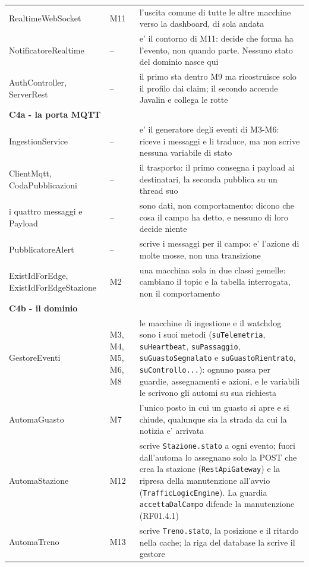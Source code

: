 \documentclass[11pt]{article}
\begin{document}
{\begin{longtable}{L{0.30\textwidth}L{0.13\textwidth}L{0.44\textwidth}}
RealtimeWebSocket & M11 & l'uscita comune di tutte le altre macchine verso la dashboard, di sola andata\\
NotificatoreRealtime & -- & e' il contorno di M11: decide che forma ha l'evento, non quando parte. Nessuno stato del dominio nasce qui\\
AuthController, ServerRest & -- & il primo sta dentro M9 ma ricostruisce solo il profilo dai claim; il secondo accende Javalin e collega le rotte\\
\hline
\textbf{C4a - la porta MQTT} &  & \\
IngestionService & -- & e' il generatore degli eventi di M3-M6: riceve i messaggi e li traduce, ma non scrive nessuna variabile di stato\\
ClientMqtt, CodaPubblicazioni & -- & il trasporto: il primo consegna i payload ai destinatari, la seconda pubblica su un thread suo\\
i quattro messaggi e Payload & -- & sono dati, non comportamento: dicono che cosa il campo ha detto, e nessuno di loro decide niente\\
PubblicatoreAlert & -- & scrive i messaggi per il campo: e' l'azione di molte mosse, non una transizione\\
ExistIdForEdge, ExistIdForEdgeStazione & M2 & una macchina sola in due classi gemelle: cambiano il topic e la tabella interrogata, non il comportamento\\
\hline
\textbf{C4b - il dominio} &  & \\
GestoreEventi & M3, M4, M5, M6, M8 & le macchine di ingestione e il watchdog sono i suoi metodi (\texttt{suTelemetria}, \texttt{suHeartbeat}, \texttt{suPassaggio}, \texttt{suGuastoSegnalato} e \texttt{suGuastoRientrato}, \texttt{suControllo...}): ognuno passa per guardie, assegnamenti e azioni, e le variabili le scrivono gli automi su sua richiesta\\
AutomaGuasto & M7 & l'unico posto in cui un guasto si apre e si chiude, qualunque sia la strada da cui la notizia e' arrivata\\
AutomaStazione & M12 & scrive \texttt{Stazione.stato} a ogni evento; fuori dall'automa lo assegnano solo la POST che crea la stazione (\texttt{RestApiGateway}) e la ripresa della manutenzione all'avvio (\texttt{TrafficLogicEngine}). La guardia \texttt{accettaDalCampo} difende la manutenzione (RF01.4.1)\\
AutomaTreno & M13 & scrive \texttt{Treno.stato}, la posizione e il ritardo nella cache; la riga del database la scrive il gestore\\

\end{longtable}}
\end{document}

